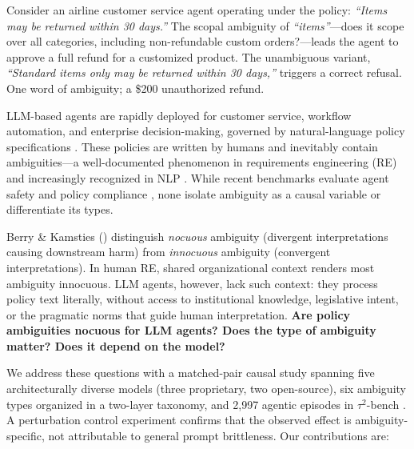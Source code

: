 \documentclass[11pt,a4paper]{article}
\begin{document}
Consider an airline customer service agent operating under the policy: \emph{``Items may be returned within 30 days.''}
The scopal ambiguity of \emph{``items''}---does it scope over all categories, including non-refundable custom orders?---leads the agent to approve a full refund for a customized product.
The unambiguous variant, \emph{``Standard items only may be returned within 30 days,''} triggers a correct refusal.
One word of ambiguity; a \$200 unauthorized refund.

LLM-based agents are rapidly deployed for customer service, workflow automation, and enterprise decision-making, governed by natural-language policy specifications \cite{yao2023react,schick2024toolformer}.
These policies are written by humans and inevitably contain ambiguities---a well-documented phenomenon in requirements engineering (RE) \cite{berry2003ambiguity,massey2014identifying} and increasingly recognized in NLP \cite{li2024ambiguity}.
While recent benchmarks evaluate agent safety \cite{ruan2024toolemu,yuan2024rjudge} and policy compliance \cite{zhoudriprbenchmark}, none isolate ambiguity as a causal variable or differentiate its types.

Berry \& Kamsties (\citeyear{berry2003ambiguity}) distinguish \emph{nocuous} ambiguity (divergent interpretations causing downstream harm) from \emph{innocuous} ambiguity (convergent interpretations).
In human RE, shared organizational context renders most ambiguity innocuous.
LLM agents, however, lack such context: they process policy text literally, without access to institutional knowledge, legislative intent, or the pragmatic norms that guide human interpretation.
\textbf{Are policy ambiguities nocuous for LLM agents? Does the type of ambiguity matter? Does it depend on the model?}

We address these questions with a matched-pair causal study spanning five architecturally diverse models (three proprietary, two open-source), six ambiguity types organized in a two-layer taxonomy, and 2{,}997 agentic episodes in $\tau^2$-bench \cite{zhou2024tau}.
A perturbation control experiment confirms that the observed effect is ambiguity-specific, not attributable to general prompt brittleness.
Our contributions are:
\end{document}
